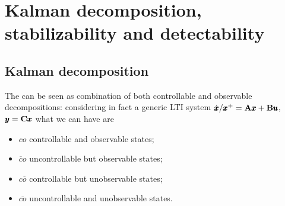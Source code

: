 \chapter{Kalman decomposition, stabilizability and detectability}
\section{Kalman decomposition}
	The  can be seen as combination of both controllable and observable decompositions: considering in fact a generic LTI system $\dot{\pmb{x}}/\pmb{x}^+ = \mathbf{A}\pmb{x}+\mathbf{B}\pmb{u}$, $\pmb{y} = \mathbf{C} \pmb{x}$ what we can have are
	\begin{itemize}
		\item $co$ controllable and observable states;
		\item $\overline c o$ uncontrollable but observable states;
		\item $c\overline o$ controllable but unobservable states;
		\item $\overline{co}$ uncontrollable and unobservable states.
	\end{itemize}

